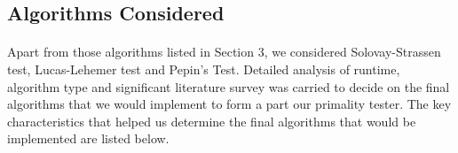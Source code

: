 \documentclass[paper=a4, fontsize=11pt]{scrartcl}	%
\numberwithin{equation}{section}		%
\numberwithin{figure}{section}		%
\numberwithin{table}{section}		%
\begin{document}
\subsection{ Algorithms Considered}
\paragraph{}Apart from those algorithms listed in Section 3, we considered Solovay-Strassen test, Lucas-Lehemer test and Pepin's Test. Detailed analysis of runtime, algorithm type and significant literature survey was carried to decide on the final algorithms that we would implement to form a part our primality tester. The key characteristics that helped us determine the final algorithms that would be implemented are listed below.

\begin{enumerate}


\end{enumerate}
\end{document}
